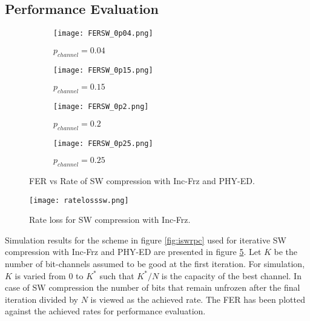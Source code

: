 \documentclass[
11pt, %
a4paper, %
oneside, %
headinclude,footinclude, %
BCOR5mm, %
]{scrartcl}
\begin{document}
\subsection*{Performance Evaluation}
\begin{figure}[h!]
\centering
\begin{subfigure}{.5\textwidth}
 \begin{center}
    \texttt{[image: FERSW\_0p04.png]}
  \end{center}
  \caption{$p_{channel}=0.04$}
  \label{fig:fersw1}
\end{subfigure}%
\begin{subfigure}{.5\textwidth}
 \begin{center}
    \texttt{[image: FERSW\_0p15.png]}
  \end{center}
  \caption{$p_{channel}=0.15$ }
  \label{fig:fersw2}
\end{subfigure}
\begin{subfigure}{.5\textwidth}
 \begin{center}
    \texttt{[image: FERSW\_0p2.png]}
  \end{center}
  \caption{$p_{channel}=0.2$ }
  \label{fig:fersw3}
\end{subfigure}%
\begin{subfigure}{.5\textwidth}
 \begin{center}
    \texttt{[image: FERSW\_0p25.png]}
  \end{center}
  \caption{$p_{channel}=0.25$ }
  \label{fig:fersw4}
\end{subfigure}
\caption{FER vs Rate of SW compression with Inc-Frz and PHY-ED.}
\label{fig:perfsw}
\end{figure}
\begin{figure}[h]
 \begin{center}
    \texttt{[image: ratelosssw.png]}
  \end{center}
  \caption{Rate loss for SW compression with Inc-Frz.}
  \label{fig:rlsw}
\end{figure}
Simulation results for the scheme in figure \ref{fig:iswrpc} used for iterative SW compression with Inc-Frz and PHY-ED are presented in figure \ref{fig:perfsw}.
Let $K$ be the number of bit-channels assumed to be good at the first iteration. For simulation, $K$ is varied from $0$ to $K^*$ such that $K^*/N$ is the capacity of the best channel. In case of SW compression the number of bits that remain unfrozen after the final iteration divided by $N$ is viewed as the achieved rate. The FER has been plotted against the achieved rates for performance evaluation.
\end{document}
